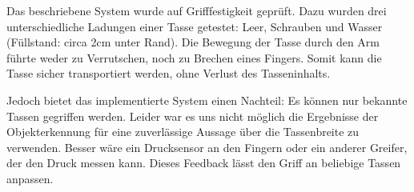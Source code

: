 Das beschriebene System wurde auf Grifffestigkeit geprüft. Dazu wurden drei unterschiedliche Ladungen einer Tasse getestet: Leer, Schrauben und Wasser (Füllstand: circa 2cm unter Rand). Die Bewegung der Tasse durch den Arm führte weder zu Verrutschen, noch zu Brechen eines Fingers. Somit kann die Tasse sicher transportiert werden, ohne Verlust des Tasseninhalts.

Jedoch bietet das implementierte System einen Nachteil: Es können nur bekannte Tassen gegriffen werden. Leider war es uns nicht möglich die Ergebnisse der Objekterkennung für eine zuverlässige Aussage über die Tassenbreite zu verwenden. Besser wäre ein Drucksensor an den Fingern oder ein anderer Greifer, der den Druck messen kann. Dieses Feedback lässt den Griff an beliebige Tassen anpassen. 
